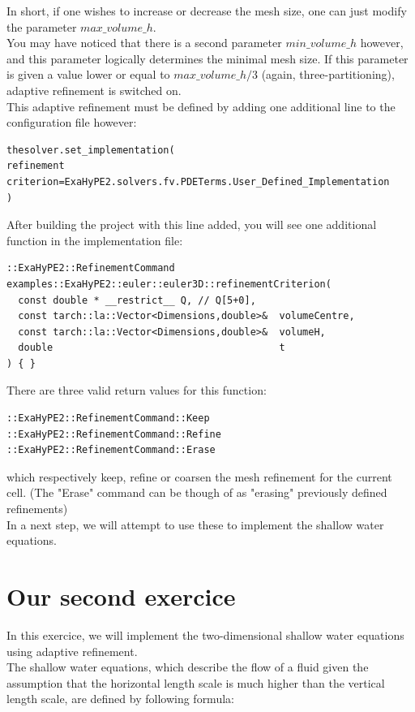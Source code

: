 \documentclass[12pt,letterpaper]{article}
\begin{document}
In short, if one wishes to increase or decrease the mesh size, one can just modify the parameter $max\_volume\_h$.\\
You may have noticed that there is a second parameter $min\_volume\_h$ however, and this parameter logically determines the minimal mesh size. If this parameter is given a value lower or equal to $max\_volume\_h / 3$ (again, three-partitioning), adaptive refinement is switched on.\\
This adaptive refinement must be defined by adding one additional line to the configuration file however:\\

\begin{lstlisting}[style = Python]
thesolver.set_implementation(
refinement criterion=ExaHyPE2.solvers.fv.PDETerms.User_Defined_Implementation
)
\end{lstlisting}

After building the project with this line added, you will see one additional function in the implementation file:

\begin{lstlisting}[style = C++]
::ExaHyPE2::RefinementCommand examples::ExaHyPE2::euler::euler3D::refinementCriterion(
  const double * __restrict__ Q, // Q[5+0],
  const tarch::la::Vector<Dimensions,double>&  volumeCentre,
  const tarch::la::Vector<Dimensions,double>&  volumeH,
  double                                       t
) { }
\end{lstlisting}

There are three valid return values for this function:

\begin{lstlisting}[style = C++]
::ExaHyPE2::RefinementCommand::Keep
::ExaHyPE2::RefinementCommand::Refine
::ExaHyPE2::RefinementCommand::Erase
\end{lstlisting}

which respectively keep, refine or coarsen the mesh refinement for the current cell. (The "Erase" command can be though of as "erasing" previously defined refinements)\\
In a next step, we will attempt to use these to implement the shallow water equations.

\newpage

\section{Our second exercice}

In this exercice, we will implement the two-dimensional shallow water equations using adaptive refinement.\\
The shallow water equations, which describe the flow of a fluid given the assumption that the horizontal length scale is much higher than the vertical length scale, are defined by following formula:
\end{document}
